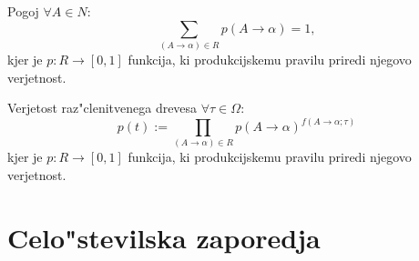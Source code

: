 \documentclass[t,usenames,dvipsnames]{beamer} %
\begin{document}
\begin{frame}
	\begin{block}{Pogoj}
		\( \forall A \in N:\)
		\[ \sum_{ (A\to \alpha) \in R }  p(A \to \alpha) = 1, \]
		kjer je \( p: R \to [0,1] \) funkcija,
		ki produkcijskemu pravilu priredi njegovo verjetnost.
	\end{block}
\end{frame}

\begin{frame}
	\begin{block}{Verjetost raz"clenitvenega drevesa}
		\( \forall \tau \in \Omega: \)
		\[ p(t) := \prod_{(A \to \alpha) \in R} p(A \to \alpha)^{f(A \to \alpha; \tau)} \]
		kjer je \( p: R \to [0,1] \) funkcija,
		ki produkcijskemu pravilu priredi njegovo verjetnost.
	\end{block}

\end{frame}

\section{Celo"stevilska zaporedja}
\begin{frame}
\end{frame}
\end{document}
